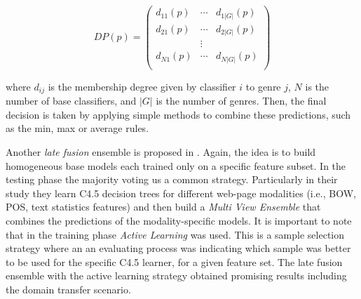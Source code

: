 \begin{equation}\label{chap:relevant_work:eq:GenreSim_DP}
	DP(p) = \left(
    	\begin{array}{ccc}
        	d_{11} (p) & \cdots & d_{1|G|} (p) \\
            d_{21} (p) & \cdots  & d_{2|G|} (p) \\
            & \vdots & \\
            d_{N1} (p) & \cdots  & d_{N|G|} (p) \\
         \end{array}
\right)
\end{equation}

\noindent
where $d_{ij}$ is the membership degree given by classifier $i$ to genre $j$, $N$ is the number of base classifiers, and $|G|$ is the number of genres. Then, the final decision is taken by applying simple methods to combine these predictions, such as the min, max or average rules.



Another \textit{late fusion} ensemble is proposed in \parencite{finn2006learning}. Again, the idea is to build homogeneous base models each trained only on a specific feature subset. In the testing phase the majority voting us a common strategy. Particularly in their study they learn C4.5 decision trees for different web-page modalities (i.e., BOW, POS, text statistics features) and then build a \textit{Multi View Ensemble} that combines the predictions of the modality-specific models. It is important to note that in the training phase \textit{Active Learning} was used. This is a sample selection strategy where an an evaluating process was indicating which sample was better to be used for the specific C4.5 learner, for a given feature set. The late fusion ensemble with the active learning strategy obtained promising results including the domain transfer scenario.

